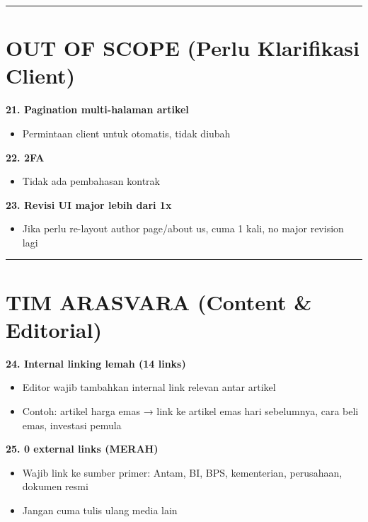 \documentclass[12pt,a4paper]{article}
\begin{document}
\vspace{12pt}
\hrule
\vspace{12pt}

\section*{OUT OF SCOPE (Perlu Klarifikasi Client)}

\textbf{21. Pagination multi-halaman artikel}
\begin{itemize}[topsep=0pt, partopsep=0pt, itemsep=2pt]
    \item Permintaan client untuk otomatis, tidak diubah
\end{itemize}

\textbf{22. 2FA}
\begin{itemize}[topsep=0pt, partopsep=0pt, itemsep=2pt]
    \item Tidak ada pembahasan kontrak
\end{itemize}

\textbf{23. Revisi UI major lebih dari 1x}
\begin{itemize}[topsep=0pt, partopsep=0pt, itemsep=2pt]
    \item Jika perlu re-layout author page/about us, cuma 1 kali, no major revision lagi
\end{itemize}

\vspace{12pt}
\hrule
\vspace{12pt}

\section*{TIM ARASVARA (Content \& Editorial)}

\textbf{24. Internal linking lemah (14 links)}
\begin{itemize}[topsep=0pt, partopsep=0pt, itemsep=2pt]
    \item Editor wajib tambahkan internal link relevan antar artikel
    \item Contoh: artikel harga emas → link ke artikel emas hari sebelumnya, cara beli emas, investasi pemula
\end{itemize}

\textbf{25. 0 external links (MERAH)}
\begin{itemize}[topsep=0pt, partopsep=0pt, itemsep=2pt]
    \item Wajib link ke sumber primer: Antam, BI, BPS, kementerian, perusahaan, dokumen resmi
    \item Jangan cuma tulis ulang media lain
\end{itemize}
\end{document}
